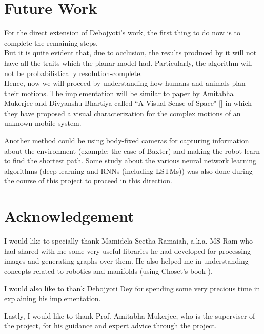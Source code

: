\documentclass[12pt, two column]{article}
\begin{document}
\section{Future Work}
For the direct extension of Debojyoti's work, the first thing to do now is to complete the remaining steps.\\ But it is quite evident that, due to occlusion, the results produced by it will not have all the traits which the planar model had. Particularly, the algorithm will not be probabilistically resolution-complete.\\
Hence, now we will proceed by understanding how humans and animals plan their motions. The implementation will be similar to paper by Amitabha Mukerjee and Divyanshu Bhartiya called ``A Visual Sense of Space" [\cite{bica}] in which they have proposed a visual characterization for the complex motions of an unknown
mobile system.

Another method could be using body-fixed cameras for capturing information about the environment (example: the case of Baxter) and making the robot learn to find the shortest path. Some study about the various neural network learning algorithms (deep learning and RNNs (including LSTMs)) was also done during the course of this project to proceed in this direction.


\section{Acknowledgement}
I would like to specially thank Mamidela Seetha Ramaiah, a.k.a. MS Ram who had shared with me some very useful libraries he had developed for processing images and generating graphs over them. He also helped me in understanding concepts related to robotics and manifolds (using Choset's book \cite{choset}).

I would also like to thank Debojyoti Dey for spending some very precious time in explaining his implementation.

Lastly, I would like to thank Prof. Amitabha Mukerjee, who is the superviser of the project, for his guidance and expert advice through the project.

% 
% 

 
\end{document}
